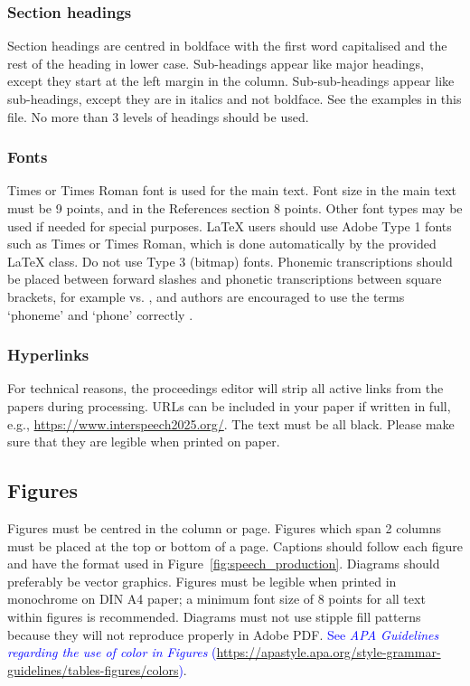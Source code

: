 \documentclass{Interspeech}
\newcommand{\blue}[1]{\textcolor{blue}{#1}}
\begin{document}
\subsubsection{Section headings}

Section headings are centred in boldface with the first word capitalised and the rest of the heading in lower case. Sub-headings appear like major headings, except they start at the left margin in the column. Sub-sub-headings appear like sub-headings, except they are in italics and not boldface. See the examples in this file. No more than 3 levels of headings should be used.

\subsubsection{Fonts}

Times or Times Roman font is used for the main text. Font size in the main text must be 9 points, and in the References section 8 points. Other font types may be used if needed for special purposes. \LaTeX\xspace users should use Adobe Type 1 fonts such as Times or Times Roman, which is done automatically by the provided \LaTeX\xspace class. Do not use Type 3 (bitmap) fonts. Phonemic transcriptions should be placed between forward slashes and phonetic transcriptions between square brackets, for example  vs. \textipa{[lO:r@nO:d@]}, and authors are encouraged to use the terms `phoneme' and `phone' correctly \cite{moore19_interspeech}.


\subsubsection{Hyperlinks}

For technical reasons, the proceedings editor will strip all active links from the papers during processing. URLs can be included in your paper if written in full, e.g., \url{https://www.interspeech2025.org/}. The text must be all black. Please make sure that they are legible  when printed on paper.


\subsection{Figures}\label{sec:figures}

Figures must be centred in the column or page. Figures which span 2 columns must be placed at the top or bottom of a page.
Captions should follow each figure and have the format used in Figure~\ref{fig:speech_production}. Diagrams should preferably be vector graphics. Figures must be legible when printed in monochrome on DIN A4 paper; a minimum font size of  8 points for all text within figures is recommended. Diagrams must not use stipple fill patterns because they will not reproduce properly in Adobe PDF. \blue{See \textit{APA Guidelines regarding the use of color in Figures} (\url{https://apastyle.apa.org/style-grammar-guidelines/tables-figures/colors})}. 
\end{document}
